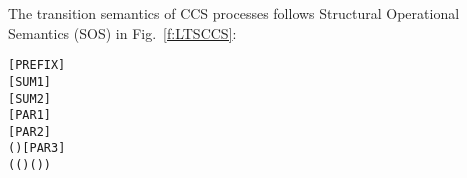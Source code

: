 The transition semantics of CCS processes follows Structural
Operational Semantics (SOS) in Fig.~\ref{f:LTSCCS}:
\begin{alltt}
\HOLTokenTurnstile{}  \HOLTokenTransBegin{}\HOLTokenTransEnd {}\hfill\texttt{[PREFIX]}
\HOLTokenTurnstile{}  \HOLTokenTransBegin{}\HOLTokenTransEnd {} \HOLSymConst{\HOLTokenImp{}}  \HOLSymConst{+}  \HOLTokenTransBegin{}\HOLTokenTransEnd {}\hfill\texttt{[SUM1]}
\HOLTokenTurnstile{}  \HOLTokenTransBegin{}\HOLTokenTransEnd {} \HOLSymConst{\HOLTokenImp{}}  \HOLSymConst{+}  \HOLTokenTransBegin{}\HOLTokenTransEnd {}\hfill\texttt{[SUM2]}
\HOLTokenTurnstile{}  \HOLTokenTransBegin{}\HOLTokenTransEnd {} \HOLSymConst{\HOLTokenImp{}}  \HOLSymConst{\ensuremath{\parallel}}  \HOLTokenTransBegin{}\HOLTokenTransEnd {} \HOLSymConst{\ensuremath{\parallel}} \hfill\texttt{[PAR1]}
\HOLTokenTurnstile{}  \HOLTokenTransBegin{}\HOLTokenTransEnd {} \HOLSymConst{\HOLTokenImp{}}  \HOLSymConst{\ensuremath{\parallel}}  \HOLTokenTransBegin{}\HOLTokenTransEnd {} \HOLSymConst{\ensuremath{\parallel}} \hfill\texttt{[PAR2]}
\HOLTokenTurnstile{}  \HOLTokenTransBegin{} \HOLTokenTransEnd {} \HOLSymConst{\HOLTokenConj{}}  \HOLTokenTransBegin{} ( )\HOLTokenTransEnd {} \HOLSymConst{\HOLTokenImp{}}  \HOLSymConst{\ensuremath{\parallel}}  \HOLTokenTransBegin\HOLSymConst{\ensuremath{\tau}}\HOLTokenTransEnd {} \HOLSymConst{\ensuremath{\parallel}} \hfill\texttt{[PAR3]}
\HOLTokenTurnstile{}  \HOLTokenTransBegin{}\HOLTokenTransEnd {} \HOLSymConst{\HOLTokenConj{}} (( \HOLSymConst{=} \HOLSymConst{\ensuremath{\tau}}) \HOLSymConst{\HOLTokenDisj{}} ( \HOLSymConst{=}  ) \HOLSymConst{\HOLTokenConj{}}  \HOLSymConst{\HOLTokenNotIn{}}  \HOLSymConst{\HOLTokenConj{}}   \HOLSymConst{\HOLTokenNotIn{}} ) \HOLSymConst{\HOLTokenImp{}}

\end{alltt}
